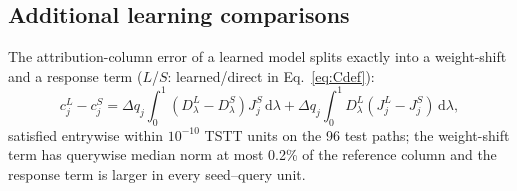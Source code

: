 \subsection{Additional learning comparisons}\label{app:legacy-learning}\label{app:learning-protocol}\label{app:calibration-protocol}
The attribution-column error of a learned model splits exactly into a
weight-shift and a response term ($L$/$S$: learned/direct in
Eq.~\eqref{eq:Cdef}):
\begin{equation}
c_j^{L}-c_j^{S}
=\Delta q_j\int_0^1(D_\lambda^{L}-D_\lambda^{S})J_j^{S}\,\mathrm{d}\lambda
+\Delta q_j\int_0^1D_\lambda^{L}(J_j^{L}-J_j^{S})\,\mathrm{d}\lambda,
\label{eq:coldecomp}
\end{equation}
satisfied entrywise within $10^{-10}$ TSTT units on the 96 test paths;
the weight-shift term has querywise median norm at most 0.2\% of the
reference column and the response term is larger in every seed--query
unit.

